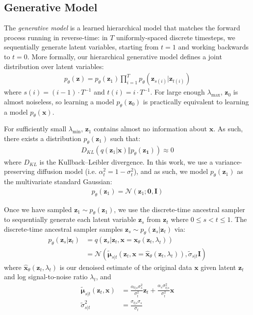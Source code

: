 \documentclass[ oneside,%
                    author={George Herbert},
                    degree={MSci},
                     title={Video Diffusion Models for Climate Simulations},
                  subtitle={}]{dissertation}
\begin{document}
\subsection{Generative Model}
\label{sec:background_diffusion_reverse}

The \textit{generative model} is a learned hierarchical model that matches the forward process running in reverse-time: in $T$ uniformly-spaced discrete timesteps, we sequentially generate latent variables, starting from $t=1$ and working backwards to $t=0$. More formally, our hierarchical generative model defines a joint distribution over latent variables:
\begin{align}
      p_\theta(\mathbf{z})=p_\theta(\mathbf{z}_1)\prod_{i=1}^T p_\theta(\mathbf{z}_{s(i)}|\mathbf{z}_{t(i)})
\end{align}
where $s(i)=(i - 1)\cdot T^{-1}$ and $t(i)=i\cdot T^{-1}$. For large enough $\lambda_{\max}$, $\mathbf{z}_0$ is almost noiseless, so learning a model $p_\theta(\mathbf{z}_0)$ is practically equivalent to learning a model $p_\theta(\mathbf{x})$. 

For sufficiently small $\lambda_{\min}$, $\mathbf{z}_1$ contains almost no information about $\mathbf{x}$. As such, there exists a distribution $p_\theta(\mathbf{z}_1)$ such that:
\begin{align}
      D_{KL}(q(\mathbf{z}_1|\mathbf{x})\Vert p_\theta(\mathbf{z_1}))\approx 0
\end{align}
where $D_{KL}$ is the Kullback--Leibler divergence. In this work, we use a variance-preserving diffusion model (i.e. $\alpha_t^2=1-\sigma_t^2$), and as such, we model $p_\theta(\mathbf{z}_1)$ as the multivariate standard Gaussian:
\begin{align}
      p_\theta(\mathbf{z}_1)=\mathcal{N}(\mathbf{z}_1;\mathbf{0}, \mathbf{I})
\end{align}

Once we have sampled $\mathbf{z}_1\sim p_\theta(\mathbf{z}_1)$, we use the discrete-time ancestral sampler \cite{DDPM_Ho} to sequentially generate each latent variable $\mathbf{z}_s$ from $\mathbf{z}_t$ where $0\le s < t \le 1$. The discrete-time ancestral sampler samples $\mathbf{z}_s\sim p_\theta(\mathbf{z}_s|\mathbf{z}_t)$ via:
\begin{align}
      p_\theta(\mathbf{z}_s|\mathbf{z}_t)&=q(\mathbf{z}_s|\mathbf{z}_t,\mathbf{x}=\hat{\mathbf{x}}_\theta(\mathbf{z}_t,\lambda_t))\\
      &=\mathcal{N}\left(\tilde{\boldsymbol\mu}_{s|t}(\mathbf{z}_t,\mathbf{x}=\hat{\mathbf{x}}_\theta(\mathbf{z}_t,\lambda_t)), \tilde{\sigma}_{s|t}\mathbf{I}\right)
\end{align}
where $\hat{\mathbf{x}}_\theta(\mathbf{z}_t,\lambda_t)$ is our denoised estimate of the original data $\mathbf{x}$ given latent $\mathbf{z}_t$ and log signal-to-noise ratio $\lambda_t$, and
\begin{align}
      \tilde{\boldsymbol\mu}_{s|t}(\mathbf{z}_t,\mathbf{x})&=\frac{\alpha_{t|s}\sigma_s^2}{\sigma_t^2}\mathbf{z}_t+\frac{\alpha_s\sigma_{t|s}^2}{\sigma_t^2}\mathbf{x}\\
      \tilde{\sigma}_{s|t}^2&=\frac{\sigma_{t|s}\sigma_s}{\sigma_t}
\end{align}
\end{document}
